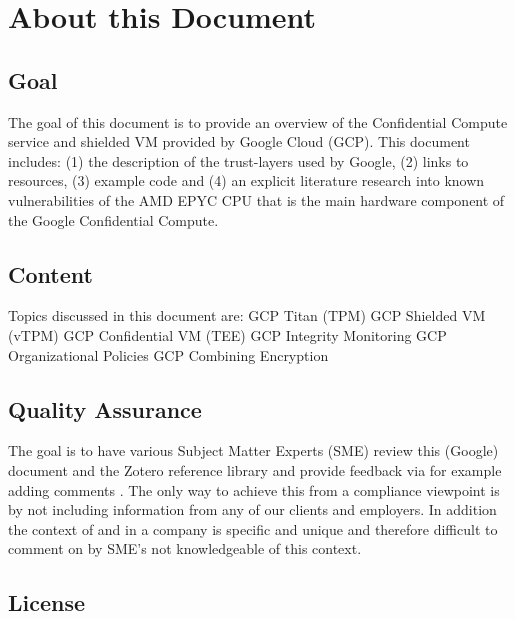 
\section{About this Document}

 
\subsection{Goal}

The goal of this document is to provide an overview of the Confidential Compute service and shielded VM provided by Google Cloud (GCP). This document includes: (1) the description of the trust-layers used by Google, (2) links to resources, (3) example code and (4) an explicit literature research into known vulnerabilities of the AMD EPYC CPU that is the main hardware component of the Google Confidential Compute. 

\subsection{Content}

Topics discussed in this document are:
GCP Titan (TPM)
GCP Shielded VM (vTPM)
GCP Confidential VM (TEE)
GCP Integrity Monitoring
GCP Organizational Policies
GCP Combining Encryption

\subsection{Quality Assurance}

The goal is to have various Subject Matter Experts (SME) review this (Google) document and the Zotero reference library and provide feedback via for example adding comments . 
The only way to achieve this from a compliance viewpoint is by not including information from any of our clients and employers. In addition the context of and in a company is specific and unique and therefore difficult to comment on by SME’s not knowledgeable of this context.

\subsection{License}

